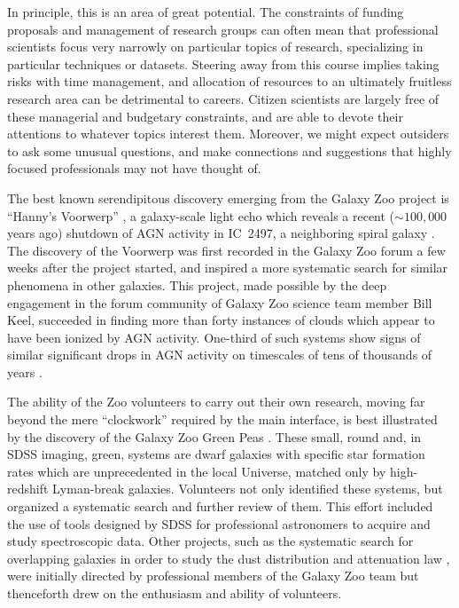 \documentclass{ar2e}
\def\CaseStudy#1{\noindent{\it\bf #1 \,\,\,\,}}
\begin{document}
In principle, this is an area of great potential. The constraints of funding
proposals and management of research groups can often mean that professional
scientists focus very narrowly on particular topics of research, specializing in
particular techniques or datasets.  Steering away from this course implies
taking risks with time management, and allocation of resources to an ultimately
fruitless research area can be detrimental to careers.  Citizen scientists are
largely free of these managerial and budgetary constraints, and are able to
devote their attentions to whatever topics interest them. Moreover, we might
expect outsiders to ask some unusual questions, and make connections and
suggestions that highly focused professionals may not have thought of. 



\CaseStudy{The Galaxy Zoo Forum.} 

The best known serendipitous discovery emerging from the Galaxy Zoo project is
``Hanny's Voorwerp'' \citep{Lintott++2009}, a galaxy-scale light echo which
reveals a recent ($\sim100,000$ years ago)  shutdown of AGN activity in IC~2497, 
a neighboring spiral galaxy \citep{Keel++2012}. 
The discovery of the Voorwerp was first
recorded in the Galaxy Zoo forum a few weeks after the project started, and
inspired a more systematic search for similar phenomena in other galaxies. This
project, made possible by the deep engagement in the forum community of Galaxy
Zoo science team member Bill Keel, succeeded in finding more than forty
instances of clouds which appear to have been ionized by AGN activity. 
One-third of such systems show signs of similar significant drops in AGN activity on
timescales of tens of thousands of years \citep{KeelAGN}.

The ability of the Zoo volunteers to carry out their own research, moving far
beyond the mere ``clockwork'' required by the main interface, is best
illustrated by the discovery of the Galaxy Zoo Green Peas
\citep{Cardamone++2009}. These small, round and, in SDSS imaging, green,
systems are dwarf galaxies with specific star formation rates which are
unprecedented in the local Universe, matched only by high-redshift Lyman-break
galaxies. Volunteers not only identified these systems, but organized a
systematic search and further review of them. This effort included the use of
tools designed by SDSS for professional astronomers to acquire and study
spectroscopic data. Other projects, such as the systematic search for
overlapping galaxies \citep{Keeloverlaps} in order to study the dust
distribution and attenuation law \citep{Keelatten}, were initially directed by
professional members of the Galaxy Zoo team but thenceforth drew on the 
enthusiasm and ability of volunteers. 
\end{document}
